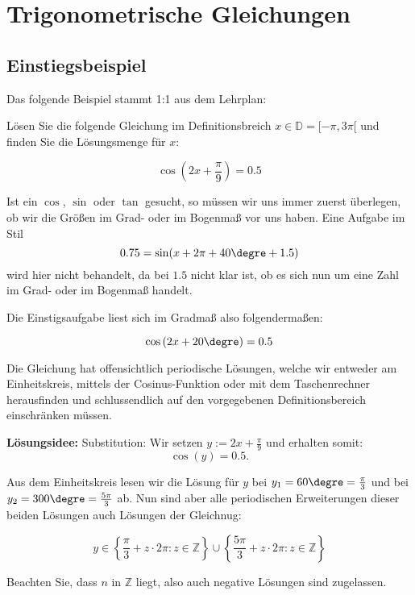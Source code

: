 
\section{Trigonometrische Gleichungen}

\subsection{Einstiegsbeispiel}
Das folgende Beispiel stammt 1:1 aus dem Lehrplan:

Lösen Sie die folgende Gleichung im Definitionsbreich $x \in \mathbb{D} = [ -\pi, 3\pi[$ und finden Sie die Lösungsmenge für $x$:

$$\cos\left(2x+\frac{\pi}{9}\right) = 0.5$$

\begin{bemerkung}{}{}
  Ist ein $\cos$, $\sin$ oder $\tan$ gesucht, so müssen wir uns immer zuerst überlegen, ob wir die Größen im Grad- oder im Bogenmaß vor uns haben. Eine Aufgabe im Stil $$0.75 = \sin(x + 2\pi + 40\degre + 1.5)$$ wird hier nicht behandelt, da bei $1.5$ nicht klar ist, ob es sich nun um eine Zahl im Grad- oder im Bogenmaß handelt.
  \end{bemerkung}

Die Einstigsaufgabe liest sich im Gradmaß also folgendermaßen:

$$\cos\left(2x+20\degre\right) = 0.5$$

Die Gleichung hat offensichtlich periodische Lösungen, welche wir entweder am Einheitskreis, mittels der Cosinus-Funktion oder mit dem Taschenrechner herausfinden und schlussendlich auf den vorgegebenen Definitionsbereich einschränken müssen.
\newpage


\textbf{Lösungsidee:} Substitution:
Wir setzen $y := 2x + \frac{\pi}{9}$ und erhalten somit:
$$\cos(y) = 0.5.$$

Aus dem Einheitskreis lesen wir die Lösung für $y$ bei $y_1=60\degre = \frac{\pi}{3}$ und bei $y_2=300\degre = \frac{5\pi}{3}$ ab. Nun sind aber alle periodischen Erweiterungen dieser beiden Lösungen auch Lösungen der Gleichnug:

$$y \in \left\{\frac{\pi}{3} + z\cdot{}2\pi: z\in\mathbb{Z}\right\} \cup \left\{\frac{5\pi}{3}+ z\cdot{}2\pi: z\in\mathbb{Z}\right\}$$

Beachten Sie, dass $n$ in $\mathbb{Z}$ liegt, also auch negative Lösungen sind zugelassen.

